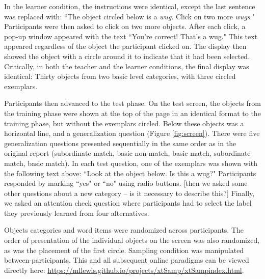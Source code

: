 \documentclass[man]{apa2}
\begin{document}
In the learner condition, the instructions were identical, except the last sentence was replaced with: ``The object circled below is a \textit{wug}.  Click on two more \textit{wugs}." Participants were then asked to click on two more objects. After each click, a pop-up window appeared with the text ``You're correct! That's a wug." This text appeared regardless of the object the participant clicked on. The display then showed the object with a circle around it to indicate that it had been selected. Critically, in both the teacher and the learner conditions, the final display was identical: Thirty objects from two basic level categories, with three circled exemplars.

Participants then advanced to the test phase. On the test screen, the objects from the training phase were shown at the top of the page in an identical format to the training phase, but without the exemplars circled. Below these objects was a horizontal line, and a generalization question (Figure \ref{fig:screen}). There were five generalization questions presented sequentially in the same order as in the original report (subordinate match, basic non-match, basic match, subordinate match, basic match). In each test question, one of the exemplars was shown with the following text above: ``Look at the object below. Is this a wug?" Participants  responded by marking ``yes" or ``no" using radio buttons.  [then we asked some other questions about a new category -- is it necessary to describe this?] Finally, we asked an attention check question where participants had to select  the label they  previously learned from four alternatives.

Objects categories and word items were randomized across participants. The order of presentation of the individual objects on the screen was also randomized, as was the placement of the first circle. Sampling condition was manipulated between-participants.  This and all subsequent online paradigms can be viewed directly here: \url{https://mllewis.github.io/projects/xtSamp/xtSampindex.html}.
\end{document}
